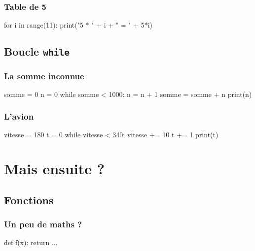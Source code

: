 \documentclass{beamer}
\begin{document}
\begin{frame}[fragile]
   \frametitle{Table de 5}
   \begin{pyverbatim}
            for i in range(11):
               print("5 * " + i + " = " + 5*i)
   \end{pyverbatim}
\end{frame}

   \subsection{Boucle \texttt{while}}\label{subsec:boucle-while}

\begin{frame}[fragile]
   \frametitle{La somme inconnue}

   \begin{pyverbatim}
         somme = 0
         n = 0
         while somme < 1000:
            n = n + 1
            somme = somme + n
         print(n)
   \end{pyverbatim}
\end{frame}

\begin{frame}[fragile]
   \frametitle{L'avion}

   \begin{pyverbatim}
         vitesse = 180
         t = 0
         while vitesse < 340:
            vitesse += 10
            t += 1
         print(t)
   \end{pyverbatim}
\end{frame}

\section{Mais ensuite ?}\label{sec:mais-ensuite}
   \subsection{Fonctions}\label{subsec:fonctions}

\begin{frame}[fragile]
   \frametitle{Un peu de maths ?}

   \begin{center}
   \end{center}

   \begin{pyverbatim}
      def f(x):
         return ...
   \end{pyverbatim}
\end{frame}
\end{document}
